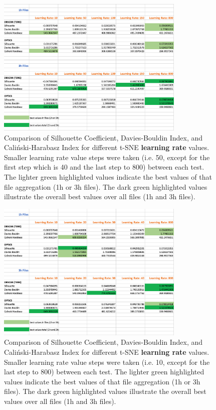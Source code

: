 \begin{figure}[H]
  \centering
  \includegraphics[width=0.8\textwidth]{./images/tsneParametersTest/learningRate/learningRateEvaluationScoresAverageDetailed.png}
  \caption{Comparison of Silhouette Coefficient, Davies-Bouldin Index, and Caliński-Harabasz Index for different t-SNE \textbf{learning rate} values. Smaller learning rate value steps were taken (i.e. 50, except for the first step which is 40 and the last step to 800) between each test. The lighter green highlighted values indicate the best values of that file aggregation (1h or 3h files). The dark green highlighted values illustrate the overall best values over all files (1h and 3h files).}
  \label{figure:learningRateEvaluationScoresAverageDetailed}
\end{figure}

\begin{figure}[H]
  \centering
  \includegraphics[width=0.8\textwidth]{./images/tsneParametersTest/learningRate/learningRateEvaluationScoresAverageDetailed2.png}
  \caption{Comparison of Silhouette Coefficient, Davies-Bouldin Index, and Caliński-Harabasz Index for different t-SNE \textbf{learning rate} values. Smaller learning rate value steps were taken (i.e. 10, except for the last step to 800) between each test. The lighter green highlighted values indicate the best values of that file aggregation (1h or 3h files). The dark green highlighted values illustrate the overall best values over all files (1h and 3h files).}
  \label{figure:learningRateEvaluationScoresAverageDetailed2}
\end{figure}

